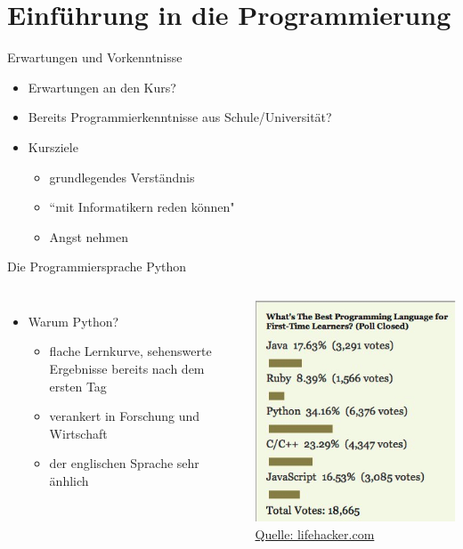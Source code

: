 \section{Einführung in die Programmierung}

\begin{frame}{Erwartungen und Vorkenntnisse}
    \begin{itemize}
        \item Erwartungen an den Kurs?
        \item Bereits Programmierkenntnisse aus Schule/Universität?
        \item Kursziele 
            \begin{itemize}
                \item grundlegendes Verständnis
                \item ``mit Informatikern reden können"
                \item Angst nehmen
            \end{itemize}
    \end{itemize}
\end{frame}

\begin{frame}{Die Programmiersprache Python}
\begin{columns}
    \begin{itemize}
        \item Warum Python?
            \begin{itemize}
                \item flache Lernkurve, sehenswerte Ergebnisse bereits nach dem ersten Tag
                \item verankert in Forschung und Wirtschaft
                \item der englischen Sprache sehr änhlich
            \end{itemize}
    \end{itemize}
    \centering\includegraphics[scale=0.5]{images/best_lang} 
    \hyperlink{https://lifehacker.com/five-best-programming-languages-for-first-time-learners-1494256243}{\tiny{Quelle: lifehacker.com}}
\end{columns}
\end{frame}

